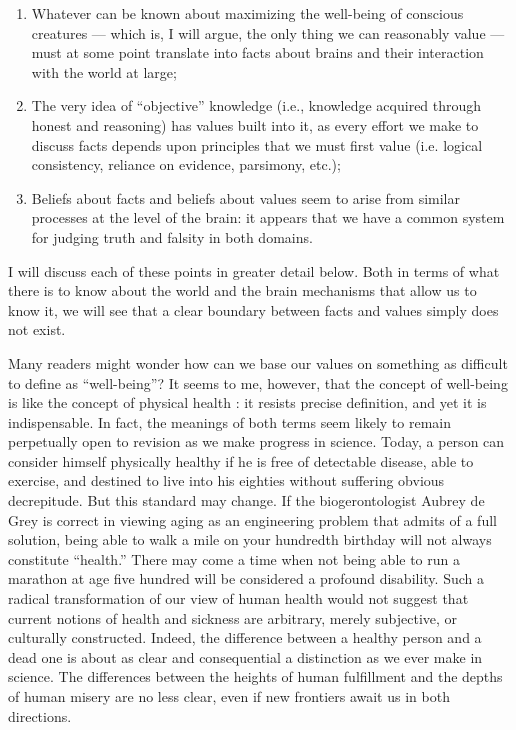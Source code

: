 \documentclass[a4paper,14pt]{extarticle}
\begin{document}
\begin{enumerate}

      \item
            Whatever can be known about maximizing the well-being of conscious creatures --- which is, I will argue, the only thing we can reasonably value --- must at some point translate into facts about brains and their interaction with the world at large;
      \item
            The very idea of ``objective'' knowledge (i.e., knowledge acquired through honest and reasoning) has values built into it, as every effort we make to discuss facts depends upon principles that we must first value (i.e. logical consistency, reliance on evidence, parsimony, etc.);
      \item
            Beliefs about facts and beliefs about values seem to arise from similar processes at the level of the brain:
            it appears that we have a common system for judging truth and falsity in both domains.

\end{enumerate}


I will discuss each of these points in greater detail below.
Both in terms of what there is to know about the world and the brain mechanisms that allow us to know it, we will see that a clear boundary between facts and values simply does not exist.

Many readers might wonder how can we base our values on something as difficult to define as ``well-being''?
It seems to me, however, that the concept of well-being is like the concept of physical health :
it resists precise definition, and yet it is indispensable.
In fact, the meanings of both terms seem likely to remain perpetually open to revision as we make progress in science.
Today, a person can consider himself physically healthy if he is free of detectable disease, able to exercise, and destined to live into his eighties without suffering obvious decrepitude.
But this standard may change.
If the biogerontologist Aubrey de Grey is correct in viewing aging as an engineering problem that admits of a full solution, being able to walk a mile on your hundredth birthday will not always constitute ``health.''
There may come a time when not being able to run a marathon at age five hundred will be considered a profound disability.
Such a radical transformation of our view of human health would not suggest that current notions of health and sickness are arbitrary, merely subjective, or culturally constructed.
Indeed, the difference between a healthy person and a dead one is about as clear and consequential a distinction as we ever make in science.
The differences between the heights of human fulfillment and the depths of human misery are no less clear, even if new frontiers await us in both directions.
\end{document}
